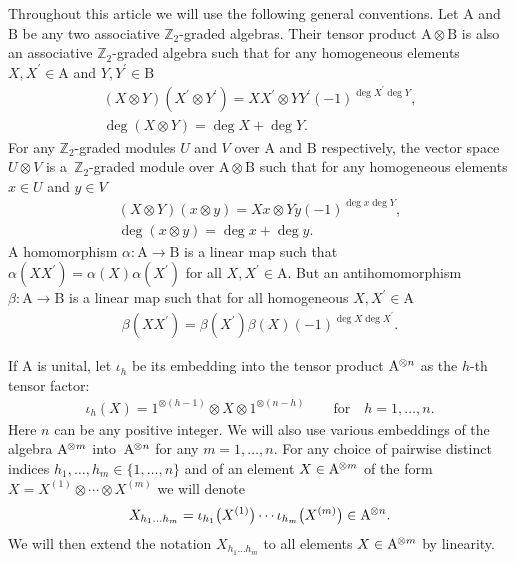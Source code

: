 \documentclass[pdftex]{sigma}
\numberwithin{equation}{section}
\def\al{\alpha}
\def\be{\beta}
\def\ns{{\hskip-.5pt}}
\def\ot{\otimes}
\def\ZZ{\mathbb{Z}}
\begin{document}
Throughout this article we will use the following general conventions.
Let $\mathrm{A}$ and $\mathrm{B}$ be any two associative
$\ZZ_{2}$-graded algebras. Their tensor product
$\mathrm{A}\ot\mathrm{B}$ is also
an associative $\ZZ_2$-graded algebra such that for any homogeneous
elements
$X,X^\prime\in\mathrm{A}$ and $Y,Y^\prime\in\mathrm{B}$
\begin{gather}\label{conv1}
(X\ot Y) (X^\prime\ot Y^\prime)=X X^\prime\ot Y Y^\prime (-1)^{\deg X^\prime\deg Y},\\
\label{conv2}
\deg (X\ot Y)=\deg X+\deg Y .
\end{gather}
For any $\ZZ_2$-graded modules
$U$ and $V$ over $\mathrm{A}$ and $\mathrm{B}$ respectively,
the vector space $U\ot V$ is a~$\ZZ_2$-graded module over
$\mathrm{A}\ot\mathrm{B}$ such that for any homogeneous elements
$x\in U$ and $y\in V$
\begin{gather}\label{XY}
(X\ot Y) ( x\ot y ) =X x\ot Y y (-1)^{\deg x \deg Y},\\
\label{xy}
\deg ( x\ot y )=\deg x+\deg y .
\end{gather}
A homomorphism $\al\colon \mathrm{A}\to\mathrm{B}$ is a linear map
such that $\al (X X^\prime)=\al (X) \al (X^\prime)$ for all
$X,X^\prime\in\mathrm{A} $. But an antihomomorphism
$\be\colon \mathrm{A}\to\mathrm{B}$ is a linear map
such that for all homogeneous $X,X^\prime\in\mathrm{A}$
\begin{gather}\label{bb}
\be (X X^\prime )=\be (X^\prime) \be (X) (-1)^{\deg X\deg X^\prime}.
\end{gather}

If $\mathrm{A}$ is unital,
let $\iota_{h}$ be
its embedding into the tensor product $\mathrm{A}^{\ns\ot n}$
as the $h $-th tensor factor:
\begin{gather*}
\iota_{h}(X)=1^{\ot (h-1)}\ot X\ot1^{\ot (n-h)}\qquad\text{for}\quad h=1,\dots, n .
\end{gather*}
Here $n$ can be any positive integer.
We will also use various embeddings of the algebra
$\mathrm{A}^{\ns\ot m}$ into~$\mathrm{A}^{\ns\ot n}$
for any $m=1,\dots, n$.
For any choice of pairwise distinct indices $h_1,\dots, h_m\in\{1,\dots, n \}$
and of an element $X\in\mathrm{A}^{\ns\ot m}$ of the form
$X=X^{(1)}\ot\cdots\ot X^{(m)}$ we will denote
\begin{gather*}
X_{h_1\dots h_m}=\iota_{h_1}\big(X^{(1)}\big) \cdots \iota_{h_m}\big(X^{(m)}\big) \in\mathrm{A}^{\ns\ot n}.
\end{gather*}
We will then extend the notation $X_{h_1\dots h_m}$ to all elements
$X\in\mathrm{A}^{\ns\ot m}$ by linearity.
\end{document}
